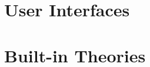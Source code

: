 \documentclass[fleqn,10pt]{report}
\begin{document}


\newpage
\newpage
\newpage


\part{User Interfaces}

\newpage
\newpage


\part{Built-in Theories}
\end{document}
